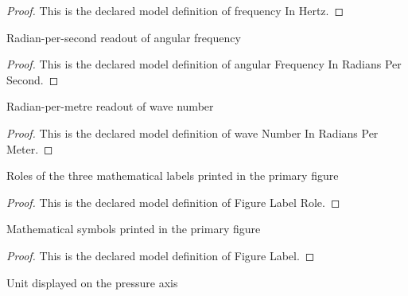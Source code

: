 \begin{proof}
  This is the declared model definition of frequency In Hertz.
\end{proof}
\begin{definition}
  \label{def:physics:phyx-mini-0309:phyxminiproblems-problemphyxmini0309-angularfrequencyinradianspersecond}
  Radian-per-second readout of angular frequency
\end{definition}
\begin{proof}
  This is the declared model definition of angular Frequency In Radians Per Second.
\end{proof}
\begin{definition}
  \label{def:physics:phyx-mini-0309:phyxminiproblems-problemphyxmini0309-wavenumberinradianspermeter}
  Radian-per-metre readout of wave number
\end{definition}
\begin{proof}
  This is the declared model definition of wave Number In Radians Per Meter.
\end{proof}
\begin{definition}
  \label{def:physics:phyx-mini-0309:phyxminiproblems-problemphyxmini0309-figurelabelrole}
  Roles of the three mathematical labels printed in the primary figure
\end{definition}
\begin{proof}
  This is the declared model definition of Figure Label Role.
\end{proof}
\begin{definition}
  \label{def:physics:phyx-mini-0309:phyxminiproblems-problemphyxmini0309-figurelabel}
  Mathematical symbols printed in the primary figure
\end{definition}
\begin{proof}
  This is the declared model definition of Figure Label.
\end{proof}
\begin{definition}
  \label{def:physics:phyx-mini-0309:phyxminiproblems-problemphyxmini0309-pressuredisplayunit}
  Unit displayed on the pressure axis
\end{definition}
